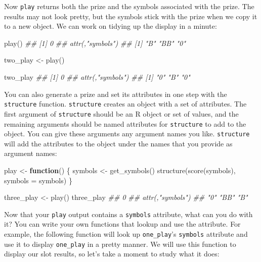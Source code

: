 \documentclass[
  letterpaper,
  DIV=11,
  numbers=noendperiod]{scrbook}
\newenvironment{Shaded}{\begin{snugshade}}{\end{snugshade}}
\newcommand{\AttributeTok}[1]{\textcolor[rgb]{0.40,0.45,0.13}{#1}}
\newcommand{\ControlFlowTok}[1]{\textcolor[rgb]{0.00,0.23,0.31}{\textbf{#1}}}
\newcommand{\DocumentationTok}[1]{\textcolor[rgb]{0.37,0.37,0.37}{\textit{#1}}}
\newcommand{\FunctionTok}[1]{\textcolor[rgb]{0.28,0.35,0.67}{#1}}
\newcommand{\NormalTok}[1]{\textcolor[rgb]{0.00,0.23,0.31}{#1}}
\newcommand{\OtherTok}[1]{\textcolor[rgb]{0.00,0.23,0.31}{#1}}
\begin{document}
Now \texttt{play} returns both the prize and the symbols associated with
the prize. The results may not look pretty, but the symbols stick with
the prize when we copy it to a new object. We can work on tidying up the
display in a minute:

\begin{Shaded}
\begin{Highlighting}[]
\FunctionTok{play}\NormalTok{()}
\DocumentationTok{\#\# [1] 0}
\DocumentationTok{\#\# attr(,"symbols")}
\DocumentationTok{\#\# [1] "B"  "BB" "0" }
 
\NormalTok{two\_play }\OtherTok{\textless{}{-}} \FunctionTok{play}\NormalTok{()}
 
\NormalTok{two\_play}
\DocumentationTok{\#\# [1] 0}
\DocumentationTok{\#\# attr(,"symbols")}
\DocumentationTok{\#\# [1] "0" "B" "0"}
\end{Highlighting}
\end{Shaded}

You can also generate a prize and set its attributes in one step with
the \texttt{structure} function. \texttt{structure} creates an object
with a set of attributes. The first argument of \texttt{structure}
should be an R object or set of values, and the remaining arguments
should be named attributes for \texttt{structure} to add to the object.
You can give these arguments any argument names you like.
\texttt{structure} will add the attributes to the object under the names
that you provide as argument names:

\begin{Shaded}
\begin{Highlighting}[]
\NormalTok{play }\OtherTok{\textless{}{-}} \ControlFlowTok{function}\NormalTok{() \{}
\NormalTok{  symbols }\OtherTok{\textless{}{-}} \FunctionTok{get\_symbols}\NormalTok{()}
  \FunctionTok{structure}\NormalTok{(}\FunctionTok{score}\NormalTok{(symbols), }\AttributeTok{symbols =}\NormalTok{ symbols)}
\NormalTok{\}}

\NormalTok{three\_play }\OtherTok{\textless{}{-}} \FunctionTok{play}\NormalTok{()}
\NormalTok{three\_play}
\DocumentationTok{\#\#  0}
\DocumentationTok{\#\#  attr(,"symbols")}
\DocumentationTok{\#\#  "0"  "BB" "B" }
\end{Highlighting}
\end{Shaded}

Now that your \texttt{play} output contains a \texttt{symbols}
attribute, what can you do with it? You can write your own functions
that lookup and use the attribute. For example, the following function
will look up \texttt{one\_play}'s \texttt{symbols} attribute and use it
to display \texttt{one\_play} in a pretty manner. We will use this
function to display our slot results, so let's take a moment to study
what it does:
\end{document}
